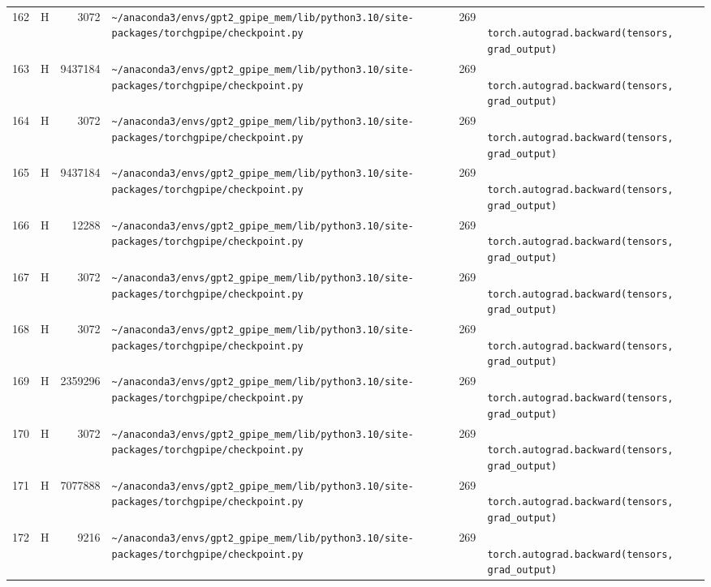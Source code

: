 \documentclass{article}
\begin{document}
\begin{longtable}{r l r p{6.5cm} r p{7.0cm}}
162 & H & 3072 & \lstinline|~/anaconda3/envs/gpt2_gpipe_mem/lib/python3.10/site-packages/torchgpipe/checkpoint.py| & 269 & \lstinline|            torch.autograd.backward(tensors, grad_output)| \\
163 & H & 9437184 & \lstinline|~/anaconda3/envs/gpt2_gpipe_mem/lib/python3.10/site-packages/torchgpipe/checkpoint.py| & 269 & \lstinline|            torch.autograd.backward(tensors, grad_output)| \\
164 & H & 3072 & \lstinline|~/anaconda3/envs/gpt2_gpipe_mem/lib/python3.10/site-packages/torchgpipe/checkpoint.py| & 269 & \lstinline|            torch.autograd.backward(tensors, grad_output)| \\
165 & H & 9437184 & \lstinline|~/anaconda3/envs/gpt2_gpipe_mem/lib/python3.10/site-packages/torchgpipe/checkpoint.py| & 269 & \lstinline|            torch.autograd.backward(tensors, grad_output)| \\
166 & H & 12288 & \lstinline|~/anaconda3/envs/gpt2_gpipe_mem/lib/python3.10/site-packages/torchgpipe/checkpoint.py| & 269 & \lstinline|            torch.autograd.backward(tensors, grad_output)| \\
167 & H & 3072 & \lstinline|~/anaconda3/envs/gpt2_gpipe_mem/lib/python3.10/site-packages/torchgpipe/checkpoint.py| & 269 & \lstinline|            torch.autograd.backward(tensors, grad_output)| \\
168 & H & 3072 & \lstinline|~/anaconda3/envs/gpt2_gpipe_mem/lib/python3.10/site-packages/torchgpipe/checkpoint.py| & 269 & \lstinline|            torch.autograd.backward(tensors, grad_output)| \\
169 & H & 2359296 & \lstinline|~/anaconda3/envs/gpt2_gpipe_mem/lib/python3.10/site-packages/torchgpipe/checkpoint.py| & 269 & \lstinline|            torch.autograd.backward(tensors, grad_output)| \\
170 & H & 3072 & \lstinline|~/anaconda3/envs/gpt2_gpipe_mem/lib/python3.10/site-packages/torchgpipe/checkpoint.py| & 269 & \lstinline|            torch.autograd.backward(tensors, grad_output)| \\
171 & H & 7077888 & \lstinline|~/anaconda3/envs/gpt2_gpipe_mem/lib/python3.10/site-packages/torchgpipe/checkpoint.py| & 269 & \lstinline|            torch.autograd.backward(tensors, grad_output)| \\
172 & H & 9216 & \lstinline|~/anaconda3/envs/gpt2_gpipe_mem/lib/python3.10/site-packages/torchgpipe/checkpoint.py| & 269 & \lstinline|            torch.autograd.backward(tensors, grad_output)| \\

\end{longtable}
\end{document}
